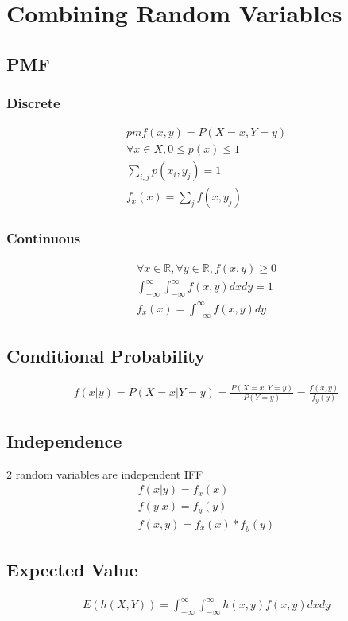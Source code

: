 \section{Combining Random Variables}
\subsection{PMF}
\subsubsection{Discrete}
\begin{align}
  pmf(x, y) = P(X = x, Y = y) \\
  \forall x \in X, 0 \leq p(x) \leq 1 \\
  \sum_{i, j}^{} p(x_i, y_j) = 1 \\
  f_x(x) = \sum_{j}^{} f(x, y_j)
\end{align}

\subsubsection{Continuous}
\begin{align}
  \forall x \in \mathbb{R}, \forall y \in \mathbb{R}, f(x, y) \geq 0 \\
  \int_{-\infty}^{\infty} \int_{-\infty}^{\infty} f(x, y) dx dy = 1 \\
  f_x(x) = \int_{-\infty}^{\infty} f(x, y) dy
\end{align}

\subsection{Conditional Probability}
\begin{align}
  f(x | y) = P(X = x | Y = y) = \frac{P(X = x, Y = y)}{P(Y = y)} = \frac{f(x, y)}{f_y(y)}
\end{align}

\subsection{Independence}
2 random variables are independent IFF
\begin{align}
  f(x | y) = f_x(x) \\
  f(y | x) = f_y(y) \\
  f(x, y) = f_x(x) * f_y(y)
\end{align}

\subsection{Expected Value}
\begin{align}
  E(h(X, Y)) = \int_{-\infty}^{\infty} \int_{-\infty}^{\infty} h(x, y) f(x, y) dx dy
\end{align}

